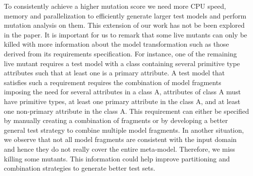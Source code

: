 To consistently achieve a higher mutation score we need more CPU speed, memory and parallelization to efficiently generate larger test models and perform mutation analysis on them. This extension of our work has not be been explored in the paper. It is important for us to remark that some live mutants can only be killed with more information about the model transformation such as those derived from its requirements specification. For instance, one of the remaining live mutant requires a test model with a class containing several primitive type attributes such that at least one is a primary attribute. A test model that satisfies such a requirement requires the combination of model fragments imposing the need for several attributes in a class A, attributes of class A must have  primitive types, at least one primary attribute in the class A, and at least one non-primary attribute in the class A. This requirement can either be specified by manually creating a combination of fragments or by developing a better general test strategy to combine multiple model fragments. In another situation, we observe that not all model fragments are consistent with the input domain and hence they do not really cover the entire meta-model. Therefore, we miss killing some mutants. This information could help improve partitioning and combination strategies to generate better test sets.

